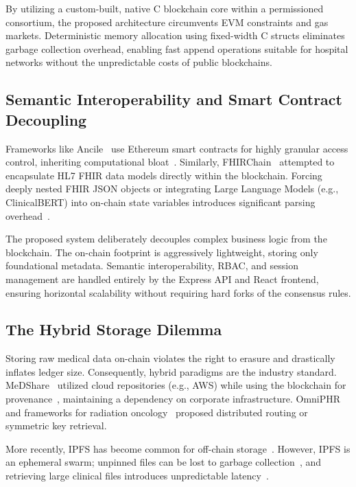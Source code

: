 \documentclass[12pt]{article}
\begin{document}
By utilizing a custom-built, native C blockchain core within a permissioned consortium, the proposed architecture circumvents EVM constraints and gas markets. Deterministic memory allocation using fixed-width C structs eliminates garbage collection overhead, enabling fast append operations suitable for hospital networks without the unpredictable costs of public blockchains.

\subsection{Semantic Interoperability and Smart Contract Decoupling}

Frameworks like Ancile~\cite{22} use Ethereum smart contracts for highly granular access control, inheriting computational bloat~\cite{23}. Similarly, FHIRChain~\cite{25} attempted to encapsulate HL7 FHIR data models directly within the blockchain. Forcing deeply nested FHIR JSON objects or integrating Large Language Models (e.g., ClinicalBERT) into on-chain state variables introduces significant parsing overhead~\cite{27, 29}.

The proposed system deliberately decouples complex business logic from the blockchain. The on-chain footprint is aggressively lightweight, storing only foundational metadata. Semantic interoperability, RBAC, and session management are handled entirely by the Express API and React frontend, ensuring horizontal scalability without requiring hard forks of the consensus rules.

\subsection{The Hybrid Storage Dilemma}

Storing raw medical data on-chain violates the right to erasure and drastically inflates ledger size. Consequently, hybrid paradigms are the industry standard. MeDShare~\cite{31} utilized cloud repositories (e.g., AWS) while using the blockchain for provenance~\cite{33}, maintaining a dependency on corporate infrastructure. OmniPHR~\cite{34} and frameworks for radiation oncology~\cite{36} proposed distributed routing or symmetric key retrieval. 

More recently, IPFS has become common for off-chain storage~\cite{38, 40}. However, IPFS is an ephemeral swarm; unpinned files can be lost to garbage collection~\cite{43}, and retrieving large clinical files introduces unpredictable latency~\cite{45}.
\end{document}

